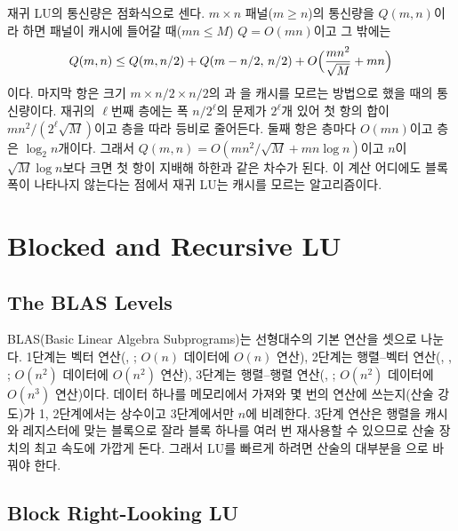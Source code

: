 재귀 LU의 통신량은 점화식으로 센다. $m\times n$ 패널($m\ge n$)의 통신량을 $Q(m,n)$이라 하면 패널이 캐시에 들어갈 때($mn\le M$) $Q=O(mn)$이고 그 밖에는
\[
Q(m,n)\le Q(m,n/2)+Q(m-n/2,\,n/2)+O\Bigl(\frac{mn^2}{\sqrt M}+mn\Bigr)
\]
이다. 마지막 항은 크기 $m\times n/2\times n/2$의 과 을 캐시를 모르는 방법으로 했을 때의 통신량이다. 재귀의 $\ell$번째 층에는 폭 $n/2^\ell$의 문제가 $2^\ell$개 있어 첫 항의 합이 $mn^2/(2^\ell\sqrt M)$이고 층을 따라 등비로 줄어든다. 둘째 항은 층마다 $O(mn)$이고 층은 $\log_2n$개이다. 그래서 $Q(m,n)=O(mn^2/\sqrt M+mn\log n)$이고 $n$이 $\sqrt M\log n$보다 크면 첫 항이 지배해 하한과 같은 차수가 된다\cite{toledo1997recursive}. 이 계산 어디에도 블록 폭이 나타나지 않는다는 점에서 재귀 LU는 캐시를 모르는 알고리즘이다.

\section{Blocked and Recursive LU}
\label{sec:lu-blocked}

\subsection{The BLAS Levels}

BLAS(Basic Linear Algebra Subprograms)는 선형대수의 기본 연산을 셋으로 나눈다\cite{lawson1979blas1,dongarra1990blas3}. 1단계는 벡터 연산(, ; $O(n)$ 데이터에 $O(n)$ 연산), 2단계는 행렬–벡터 연산(, , ; $O(n^2)$ 데이터에 $O(n^2)$ 연산), 3단계는 행렬–행렬 연산(, ; $O(n^2)$ 데이터에 $O(n^3)$ 연산)이다. 데이터 하나를 메모리에서 가져와 몇 번의 연산에 쓰는지(산술 강도)가 1, 2단계에서는 상수이고 3단계에서만 $n$에 비례한다. 3단계 연산은 행렬을 캐시와 레지스터에 맞는 블록으로 잘라 블록 하나를 여러 번 재사용할 수 있으므로 산술 장치의 최고 속도에 가깝게 돈다. 그래서 LU를 빠르게 하려면 산술의 대부분을 으로 바꿔야 한다.

\subsection{Block Right-Looking LU}

